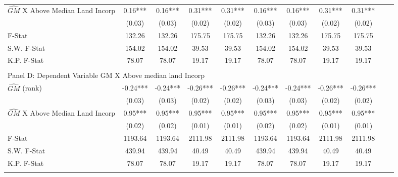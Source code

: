 \begin{table}[htbp]
\begin{threeparttable}
\begin{tabular}{l*{10}{c}}
\addlinespace
$\hat{GM}$ X Above Median Land Incorp&       0.16***&       0.16***&       0.31***&       0.31***&       0.16***&       0.16***&       0.31***&       0.31***\\
                &     (0.03)   &     (0.03)   &     (0.02)   &     (0.02)   &     (0.03)   &     (0.03)   &     (0.02)   &     (0.02)   \\
\midrule
F-Stat          &     132.26   &     132.26   &     175.75   &     175.75   &     132.26   &     132.26   &     175.75   &     175.75   \\
S.W. F-Stat     &     154.02   &     154.02   &      39.53   &      39.53   &     154.02   &     154.02   &      39.53   &      39.53   \\
K.P. F-Stat     &      78.07   &      78.07   &      19.17   &      19.17   &      78.07   &      78.07   &      19.17   &      19.17   \\
\cmidrule[\heavyrulewidth](lr){1-9} \\ \cmidrule[\heavyrulewidth](lr){1-9}
\multicolumn{8}{l}{Panel D: Dependent Variable GM X Above median land Incorp}\\
\cmidrule(lr){1-9}
$\hat{GM}$ (rank)&      -0.24***&      -0.24***&      -0.26***&      -0.26***&      -0.24***&      -0.24***&      -0.26***&      -0.26***\\
                &     (0.03)   &     (0.03)   &     (0.02)   &     (0.02)   &     (0.03)   &     (0.03)   &     (0.02)   &     (0.02)   \\
\addlinespace
$\hat{GM}$ X Above Median Land Incorp&       0.95***&       0.95***&       0.95***&       0.95***&       0.95***&       0.95***&       0.95***&       0.95***\\
                &     (0.02)   &     (0.02)   &     (0.01)   &     (0.01)   &     (0.02)   &     (0.02)   &     (0.01)   &     (0.01)   \\
\midrule
F-Stat          &    1193.64   &    1193.64   &    2111.98   &    2111.98   &    1193.64   &    1193.64   &    2111.98   &    2111.98   \\
S.W. F-Stat     &     439.94   &     439.94   &      40.49   &      40.49   &     439.94   &     439.94   &      40.49   &      40.49   \\
K.P. F-Stat     &      78.07   &      78.07   &      19.17   &      19.17   &      78.07   &      78.07   &      19.17   &      19.17   \\
\cmidrule[\heavyrulewidth](lr){1-9} \\ \cmidrule[\heavyrulewidth](lr){1-9}

\end{tabular}
\end{threeparttable}
\end{table}
